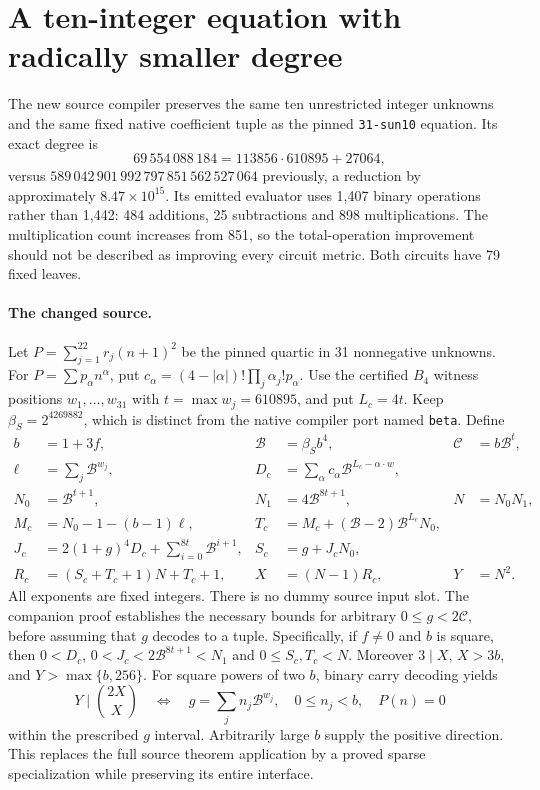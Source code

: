 \section{A ten-integer equation with radically smaller degree}
\label{sec:sun-b4}
The new source compiler preserves the same ten unrestricted integer
unknowns and the same fixed native coefficient tuple as the pinned
\texttt{31-sun10} equation. Its exact degree is
\[
 \boxed{69\,554\,088\,184=113856\cdot610895+27064},
\]
versus $589\,042\,901\,992\,797\,851\,562\,527\,064$ previously, a reduction
by approximately $8.47\times10^{15}$. Its emitted evaluator uses 1,407
binary operations rather than 1,442: 484 additions, 25 subtractions and
898 multiplications. The multiplication count increases from 851, so
the total-operation improvement should not be described as improving
every circuit metric. Both circuits have 79 fixed leaves.

\paragraph{The changed source.}
Let $P=\sum_{j=1}^{22}r_j(n+1)^2$ be the pinned quartic in 31 nonnegative
unknowns. For $P=\sum p_\alpha n^\alpha$, put
$c_\alpha=(4-|\alpha|)!\prod_j\alpha_j!p_\alpha$.
Use the certified $B_4$ witness positions $w_1,\ldots,w_{31}$ with
$t=\max w_j=610895$, and put $L_c=4t$.
Keep $\beta_S=2^{4269882}$, which is distinct from the native compiler
port named \texttt{beta}. Define
\begin{align*}
 b&=1+3f,&\mathcal B&=\beta_Sb^4,&\mathscr C&=b\mathcal B^t,\\
 \ell&=\sum_j\mathcal B^{w_j},&
 D_c&=\sum_\alpha c_\alpha\mathcal B^{L_c-\alpha\cdot w},\\
 N_0&=\mathcal B^{t+1},&N_1&=4\mathcal B^{8t+1},&N&=N_0N_1,\\
 M_c&=N_0-1-(b-1)\ell,&
 T_c&=M_c+(\mathcal B-2)\mathcal B^{L_c}N_0,\\
 J_c&=2(1+g)^4D_c+\sum_{i=0}^{8t}\mathcal B^{i+1},&S_c&=g+J_cN_0,\\
 R_c&=(S_c+T_c+1)N+T_c+1,&X&=(N-1)R_c,&Y&=N^2.
\end{align*}
All exponents are fixed integers. There is no dummy source input slot.
The companion proof establishes the necessary bounds for arbitrary
$0\le g<2\mathscr C$, before assuming that $g$ decodes to a tuple.
Specifically, if $f\ne0$ and $b$ is square, then
$0<D_c$, $0<J_c<2\mathcal B^{8t+1}<N_1$ and $0\le S_c,T_c<N$.
Moreover $3\mid X$, $X>3b$, and $Y>\max\{b,256\}$.
For square powers of two $b$, binary carry decoding yields
\[
 Y\mid\binom{2X}{X}
 \quad\Longleftrightarrow\quad
 g=\sum_jn_j\mathcal B^{w_j},\quad 0\le n_j<b,\quad P(n)=0
\]
within the prescribed $g$ interval. Arbitrarily large $b$ supply the
positive direction. This replaces the full source theorem application
by a proved sparse specialization while preserving its entire interface.

